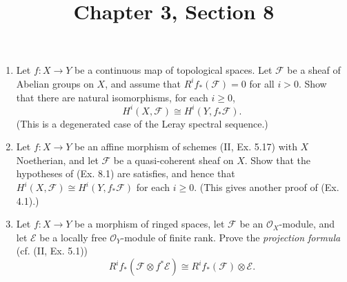 \documentclass{article}
\title{Chapter 3, Section 8}
\newcommand{\fF}{\mathscr{F}}
\newcommand{\fE}{\mathscr{E}}
\newcommand{\fO}{\mathscr{O}}
\begin{document}
\maketitle
\begin{enumerate} [label=\textbf{\arabic*.}, leftmargin=0em]

\item Let $f : X \to Y$ be a continuous map of topological spaces. Let $\fF$ be a sheaf of Abelian groups on $X$, and assume that $R^i f_*(\fF) = 0$ for all $i > 0$. Show that there are natural isomorphisms, for each $i \geq 0$,
\begin{equation*}
  H^i(X, \fF) \cong H^i(Y, f_* \fF).
\end{equation*}
(This is a degenerated case of the Leray spectral sequence.)

\item Let $f : X \to Y$ be an affine morphism of schemes (II, Ex. 5.17) with $X$ Noetherian, and let $\fF$ be a quasi-coherent sheaf on $X$. Show that the hypotheses of (Ex. 8.1) are satisfies, and hence that $H^i(X, \fF) \cong H^i(Y, f_* \fF)$ for each $i \geq 0$. (This gives another proof of (Ex. 4.1).)

\item Let $f : X \to Y$ be a morphism of ringed spaces, let $\fF$ be an $\fO_X$-module, and let $\fE$ be a locally free $\fO_Y$-module of finite rank. Prove the \textit{projection formula} (cf. (II, Ex. 5.1))
\begin{equation*}
  R^if_*(\fF \otimes f^* \mathscr{E}) \cong R^i f_*(\fF) \otimes \mathscr{E}.
\end{equation*}


\end{enumerate}
\end{document}
